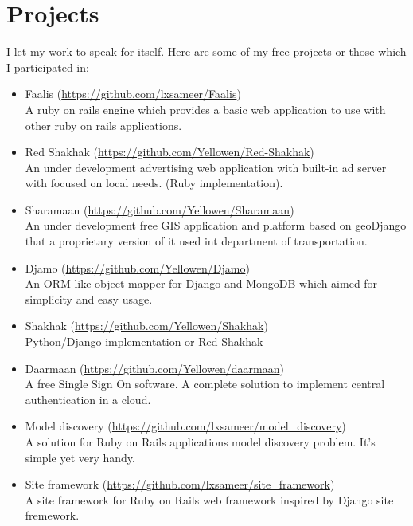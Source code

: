 \documentclass[a4paper,11pt]{article}
\begin{document}
\section*{Projects}
I let my work to speak for itself. Here are some of my free projects
or those which I participated in:\\

\begin{itemize}

\item Faalis (\url{https://github.com/lxsameer/Faalis})\\
  A ruby on rails engine which provides a basic web application to
  use with other ruby on rails applications.

\item Red Shakhak (\url{https://github.com/Yellowen/Red-Shakhak})\\
  An under development advertising web application with built-in ad
  server with focused on local needs. (Ruby implementation).

\item Sharamaan (\url{https://github.com/Yellowen/Sharamaan})\\
  An under development free GIS application and platform based on
  geoDjango that a proprietary version of it used int department of
  transportation.

\item Djamo (\url{https://github.com/Yellowen/Djamo})\\
  An ORM-like object mapper for Django and MongoDB which aimed for
  simplicity and easy usage.

\item Shakhak (\url{https://github.com/Yellowen/Shakhak})\\
  Python/Django implementation or Red-Shakhak

\item Daarmaan (\url{https://github.com/Yellowen/daarmaan})\\
  A free Single Sign On software. A complete solution to implement
  central authentication in a cloud.

\item Model discovery (\url{https://github.com/lxsameer/model_discovery})\\
  A solution for Ruby on Rails applications model discovery problem.
  It's simple yet very handy.

\item Site framework (\url{https://github.com/lxsameer/site_framework})\\
  A site framework for Ruby on Rails web framework inspired by
  Django site fremework.


\end{itemize}
\end{document}
